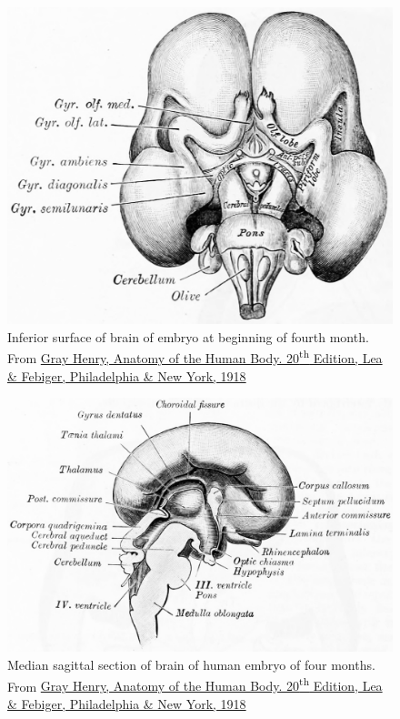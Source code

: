 \begin{figure}

{\centering \includegraphics[width=0.7\linewidth]{./figures/development/GrayAnat1918p744} 

}

\caption{Inferior surface of brain of embryo at beginning of fourth month. From \href{https://archive.org/details/anatomyofhumanbo1918gray/page/n6/mode/2up}{Gray Henry, Anatomy of the Human Body. 20\textsuperscript{th} Edition, Lea \& Febiger, Philadelphia \& New York, 1918}}\label{fig:fourmonths}
\end{figure}



\begin{figure}

{\centering \includegraphics[width=0.7\linewidth]{./figures/development/GrayAnat1918p746} 

}

\caption{Median sagittal section of brain of human embryo of four months. From \href{https://archive.org/details/anatomyofhumanbo1918gray/page/n6/mode/2up}{Gray Henry, Anatomy of the Human Body. 20\textsuperscript{th} Edition, Lea \& Febiger, Philadelphia \& New York, 1918}}\label{fig:fourmonthsmedian}
\end{figure}

